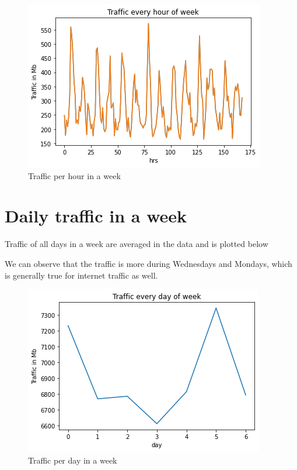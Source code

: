 \begin{figure}[H]
    \centering
    \includegraphics{everyhour.png}
    \caption{Traffic per hour in a week}
    \label{fig:everyhour}
\end{figure}

\section{Daily traffic in a week}
Traffic of all days in a week are averaged in the data and is plotted below

We can observe that the traffic is more during Wednesdays and Mondays, which is generally true for internet traffic as well.

\begin{figure}[H]
    \centering
    \includegraphics{everyday.png}
    \caption{Traffic per day in a week}
    \label{fig:everyday}
\end{figure}
